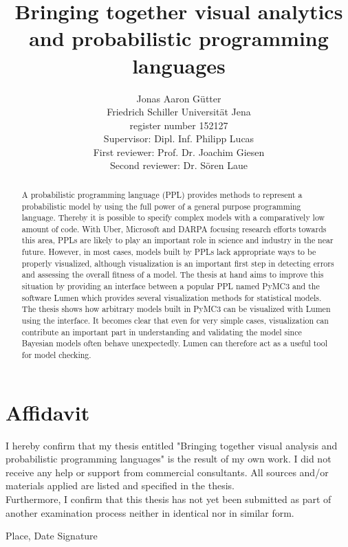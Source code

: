 \documentclass{article}
\title{Bringing together visual analytics and probabilistic programming languages}
\author{Jonas Aaron Gütter  \\
	Friedrich Schiller Universität Jena  \\
    register number 152127 \\
    Supervisor: Dipl. Inf. Philipp Lucas\\
    First reviewer: Prof. Dr. Joachim Giesen \\
    Second reviewer: Dr. Sören Laue
	}
\begin{document}
\maketitle

\begin{abstract}
A probabilistic programming language (PPL) provides methods to represent a probabilistic model by using the full power of a general purpose programming language. Thereby it is possible to specify complex models with a comparatively low amount of code. With Uber, Microsoft and DARPA focusing research efforts towards this area, PPLs are likely to play an important role in science and industry in the near future. However, in most cases, models built by PPLs lack appropriate ways to be properly visualized, although visualization is an important first step in detecting errors and assessing the overall fitness of a model. The thesis at hand aims to improve this situation by providing an interface between a popular PPL named PyMC3 and the software Lumen which provides several visualization methods for statistical models. The thesis shows how arbitrary models built in PyMC3 can be visualized with Lumen using the interface. It becomes clear that even for very simple cases, visualization can contribute an important part in understanding and validating the model since Bayesian models often behave unexpectedly. Lumen can therefore act as a useful tool for model checking.
\end{abstract}

\section*{Affidavit}
I hereby confirm that my thesis entitled "Bringing together visual analysis and probabilistic programming languages" is the result of my own work. I did not receive any help or support from commercial consultants. All sources and/or materials applied are listed and specified in the thesis.\\
Furthermore, I confirm that this thesis has not yet been submitted as part of another examination process neither in identical nor in similar form.
\vspace{4cm}

Place, Date \hfill Signature \hspace{2cm}

\tableofcontents
\end{document}
